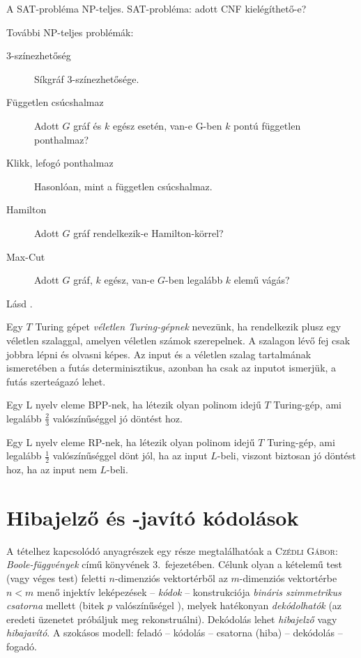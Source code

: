 \documentclass[%
	DIV=15,appendixprefix]{scrreprt}
\theoremstyle{definition}
\theoremstyle{remark}
\begin{document}
A SAT-probléma NP-teljes. SAT-probléma: adott CNF kielégíthető-e?

További NP-teljes problémák:
\begin{description}
	\item[3-színezhetőség] Síkgráf 3-színezhetősége.
	\item[Független csúcshalmaz] Adott $G$ gráf és $k$ egész esetén, van-e G-ben $k$ pontú független
		ponthalmaz?
	\item[Klikk, lefogó ponthalmaz] Hasonlóan, mint a független csúcshalmaz.
	\item[Hamilton] Adott $G$ gráf rendelkezik-e Hamilton-körrel?
	\item[Max-Cut] Adott $G$ gráf, $k$ egész, van-e $G$-ben legalább $k$ elemű vágás?
\end{description}
%
Lásd
\cite[\href{http://www.math.u-szeged.hu/~hajnal/courses/MSc_Bonyolultsag/ea10.pdf}{
\emph{Véletlen számítások, bonyolultsági osztályok}}]{Bonya}.

Egy $T$ Turing gépet \emph{véletlen Turing-gépnek} nevezünk, ha rendelkezik plusz egy véletlen
szalaggal, amelyen véletlen számok szerepelnek. A szalagon lévő fej csak jobbra lépni és olvasni
képes. Az input és a véletlen szalag tartalmának ismeretében a futás determinisztikus, azonban ha
csak az inputot ismerjük, a futás szerteágazó lehet.

Egy L nyelv eleme BPP-nek, ha létezik olyan polinom idejű $T$ Turing-gép, ami legalább
$\frac{ 2 }{ 3 }$ valószínűséggel jó döntést hoz.

Egy L nyelv eleme RP-nek, ha létezik olyan polinom idejű $T$ Turing-gép, ami legalább
$\frac{ 1 }{ 2 }$ valószínűséggel dönt jól, ha az input $L$-beli, viszont biztosan jó döntést hoz, ha az input nem $L$-beli.
%
\section{Hibajelző és -javító kódolások}
A tételhez kapcsolódó anyagrészek egy része megtalálhatóak a \textsc{Czédli Gábor}:
\emph{Boole-függvények} \cite{Czedli} című könyvének 3.~fejezetében.
%
Célunk olyan a kételemű test (vagy véges test) feletti $ n $-dimenziós vektortérből az
$ m $-dimenziós vektortérbe
$ n < m $ menő injektív leképezések -- \emph{kódok} -- konstrukciója \emph{bináris
szimmetrikus csatorna} mellett (bitek $ p $ valószínűségel ), melyek hatékonyan
\emph{dekódolhatók} (az eredeti üzenetet próbáljuk meg rekonstruálni). Dekódolás lehet
\emph{hibajelző} vagy \emph{hibajavító}. A szokásos modell: feladó -- kódolás -- csatorna (hiba) --
dekódolás -- fogadó.
\end{document}
